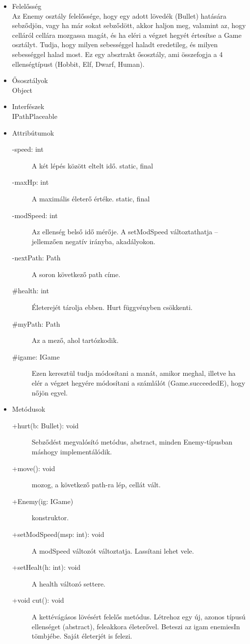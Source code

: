 \begin{itemize}
\item Felelősség\\
Az Enemy osztály felelőssége, hogy egy adott lövedék (Bullet) hatására sebződjön, vagy ha már sokat sebződött, akkor haljon meg, valamint az, hogy celláról cellára mozgassa magát, és ha eléri a végzet hegyét értesítse a Game osztályt. Tudja, hogy milyen sebességgel haladt eredetileg, és milyen sebességgel halad most. Ez egy absztrakt ősosztály, ami összefogja a 4 ellenségtípust (Hobbit, Elf, Dwarf, Human).
\item Ősosztályok\\
Object
\item Interfészek\\
IPathPlaceable
\item Attribútumok\\
	\begin{description}
		\item[-speed: int] A két lépés között eltelt idő. static, final
		\item[-maxHp: int] A maximális életerő értéke. static, final
\item[-modSpeed: int] Az ellenség belső idő mérője. A setModSpeed változtathatja – jellemzően negatív irányba, akadályokon. 
\item[-nextPath: Path] A soron következő path címe. 
\item[#health: int] Életerejét tárolja ebben. Hurt függvényben csökkenti. 
\item[#myPath: Path] Az a mező, ahol tartózkodik. 
\item[#igame: IGame] Ezen keresztül tudja módosítani a manát, amikor meghal, illetve ha elér a végzet hegyére módosítani a számlálót (Game.succeededE), hogy nőjön egyel. 

	\end{description}
\item Metódusok\\
	\begin{description}
		\item[+hurt(b: Bullet): void] Sebződést megvalósító metódus, abstract, minden Enemy-típusban máshogy implementálódik. 
\item[+move(): void] mozog, a következő path-ra lép, cellát vált. 
\item[+Enemy(ig: IGame)] konstruktor. 
\item[+setModSpeed(msp: int): void] A modSpeed változót változtatja. Lassítani lehet vele. 
\item[+setHealt(h: int): void] A health változó settere. 
\item[+void cut(): void] A kettévágásos lövésért felelős metódus. Létrehoz egy új, azonos típusú ellenséget (abstract), feleakkora életerővel. Beteszi az igam enemiesIn tömbjébe. Saját életerjét is felezi. 

	\end{description}
\end{itemize}

